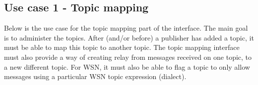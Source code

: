 \subsection{Use case 1 - Topic mapping}
\label{subsec:requirements_engineering-use_cases-topic_mapping}

Below is the use case for the topic mapping part of the interface. The main goal is to administer the topics. After (and/or before) a publisher has added a topic, it must be able to map this topic to another topic. The topic mapping interface must also provide a way of creating relay from messages received on one topic, to a new different topic. For WSN, it must also be able to flag a topic to only allow messages using a particular WSN topic expression (dialect).

\begin{table}[ht!]
\begin{minipage}{.5\textwidth}
\centering
{}
\end{minipage}
\end{table}
